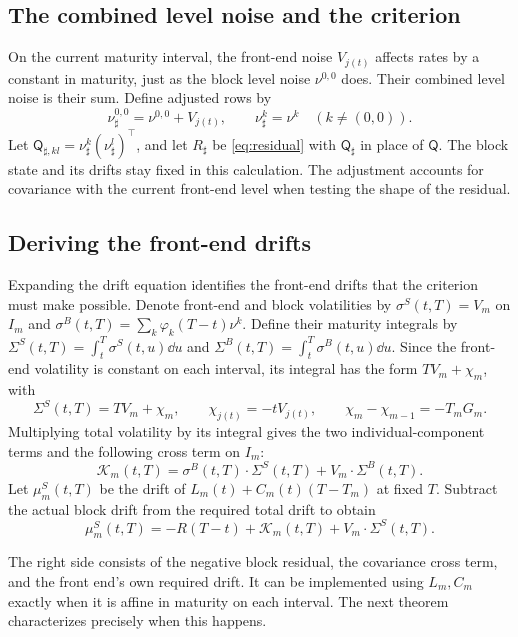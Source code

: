 \subsection{The combined level noise and the criterion}
On the current maturity interval, the front-end noise $V_{j(t)}$ affects rates by a constant in maturity, just as the block level noise $\nu^{0,0}$ does. Their combined level noise is their sum. Define adjusted rows by
\begin{equation}
\nu^{0,0}_\sharp=\nu^{0,0}+V_{j(t)},\qquad \nu^k_\sharp=\nu^k\quad(k\ne(0,0)).\label{eq:effective}
\end{equation}
Let $\mathsf Q_{\sharp,kl}=\nu^k_\sharp(\nu^l_\sharp)^\top$, and let $R_\sharp$ be \eqref{eq:residual} with $\mathsf Q_\sharp$ in place of $\mathsf Q$. The block state and its drifts stay fixed in this calculation. The adjustment accounts for covariance with the current front-end level when testing the shape of the residual.

\subsection{Deriving the front-end drifts}
Expanding the drift equation identifies the front-end drifts that the criterion must make possible. Denote front-end and block volatilities by $\sigma^S(t,T)=V_m$ on $I_m$ and $\sigma^B(t,T)=\sum_k\varphi_k(T-t)\nu^k$. Define their maturity integrals by $\Sigma^S(t,T)=\int_t^T\sigma^S(t,u)\dd u$ and $\Sigma^B(t,T)=\int_t^T\sigma^B(t,u)\dd u$. Since the front-end volatility is constant on each interval, its integral has the form $TV_m+\chi_m$, with
\[
\Sigma^S(t,T)=TV_m+\chi_m,\qquad
\chi_{j(t)}=-tV_{j(t)},\qquad \chi_m-\chi_{m-1}=-T_mG_m.
\]
Multiplying total volatility by its integral gives the two individual-component terms and the following cross term on $I_m$:
\[
\mathcal K_m(t,T)=\sigma^B(t,T)\cdot\Sigma^S(t,T)+V_m\cdot\Sigma^B(t,T).
\]
Let $\mu_m^S(t,T)$ be the drift of $L_m(t)+C_m(t)(T-T_m)$ at fixed $T$. Subtract the actual block drift from the required total drift to obtain
\begin{equation}
\mu_m^S(t,T)=-R(T-t)+\mathcal K_m(t,T)+V_m\cdot\Sigma^S(t,T).
\label{eq:frontmatch}
\end{equation}

The right side consists of the negative block residual, the covariance cross term, and the front end's own required drift. It can be implemented using $L_m,C_m$ exactly when it is affine in maturity on each interval. The next theorem characterizes precisely when this happens.


